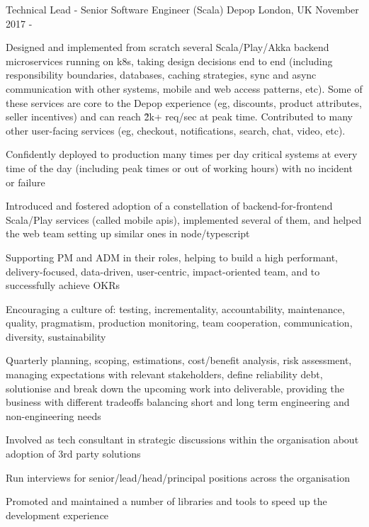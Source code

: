 \begin{cventries}
\cventry
  {Technical Lead - Senior Software Engineer (Scala)}
{Depop}
	{London, UK}
	{November 2017 - \present{}}
{%
\begin{cvitems} 
\item Designed and implemented from scratch several Scala/Play/Akka backend microservices running on k8s, taking design decisions end to end (including responsibility boundaries, databases, caching strategies, sync and async communication with other systems, mobile and web access patterns, etc). Some of these services are core to the Depop experience (eg, discounts, product attributes, seller incentives) and can reach \~ 2k+ req/sec at peak time. 
  Contributed to many other user-facing services (eg, checkout, notifications, search, chat, video, etc). 
\item Confidently deployed to production many times per day critical systems at every time of the day (including peak times or out of working hours) with no incident or failure 
  \item Introduced and fostered adoption of a constellation of backend-for-frontend Scala/Play services (called mobile apis), implemented several of them, and helped the web team setting up similar ones in node/typescript 
\item Supporting PM and ADM in their roles, helping to build a high performant, delivery-focused, data-driven, user-centric, impact-oriented team, and to successfully achieve OKRs 
  \item Encouraging a culture of: testing, incrementality, accountability, maintenance, quality, pragmatism, production monitoring, team cooperation, communication, diversity, sustainability
\item Quarterly planning, scoping, estimations, cost/benefit analysis, risk assessment, managing expectations with relevant stakeholders, define reliability debt, solutionise and break down the upcoming work into deliverable, providing the business with different tradeoffs balancing short and long term engineering and non-engineering needs 
\item Involved as tech consultant in strategic discussions within the organisation about adoption of 3rd party solutions %
  \item Run interviews for senior/lead/head/principal positions across the organisation 
  \item Promoted and maintained a number of libraries and tools to speed up the development experience %

\end{cvitems}}
\end{cventries}
